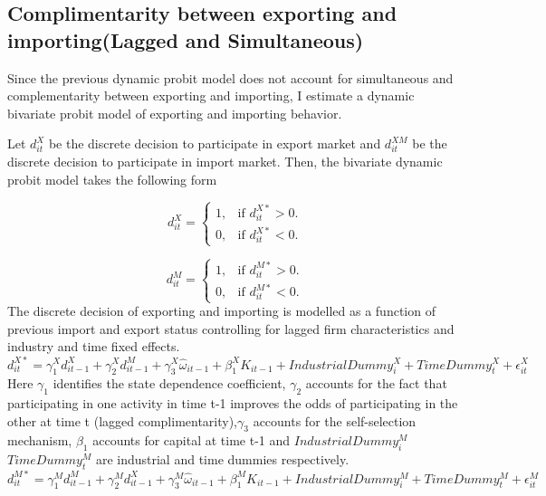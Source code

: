 \documentclass[11pt]{article}
\begin{document}
\subsection{Complimentarity between exporting and importing(Lagged and
Simultaneous)}
Since the previous dynamic probit model does not account for simultaneous and
 complementarity between exporting and importing, I estimate a
dynamic bivariate probit model of exporting and importing behavior. 

Let $d_{it}^{X}$ be the discrete decision to participate in export
market and $d_{it}^{XM}$ be the discrete decision to participate in import
market.  Then, the bivariate dynamic probit model takes the following form 

\begin{equation}
  d_{it}^{X}=\begin{cases}
   1 , & \text{if $d_{it}^{X*}>  0$}.\\
   0 , & \text{if $d_{it}^{X*}<  0$}.
  \end{cases}
\end{equation}

\begin{equation}
  d_{it}^{M}=\begin{cases}
   1 , & \text{if $d_{it}^{M*}>  0$}.\\
   0 , & \text{if $d_{it}^{M*}<  0$}.
  \end{cases}
\end{equation}
The discrete decision of exporting and importing is modelled as a function of previous import and
export status controlling for lagged firm characteristics and industry and time fixed
effects. 
\begin{equation}
d_{it}^{X*} = \gamma_{1}^{X} d_{it-1}^{X} + \gamma_{2}^{X} d_{it-1}^{M}+
\gamma_{3}^{X} \hat{\omega}_{it-1}  + \beta_{1}^{X}K_{it-1}  +
IndustrialDummy_{i}^{X} + TimeDummy_{t}^{X}  + \epsilon_{it}^{X}
\end{equation}
Here $\gamma_{1}$ identifies the state dependence coefficient, $\gamma_{2}$ accounts for
the fact that participating in one activity in time t-1 improves the
odds of participating in the other at time t (lagged complimentarity),$\gamma_{3}$ accounts for
the self-selection mechanism, $\beta_{1}$ accounts for capital at time
t-1 and $IndustrialDummy_{i}^{M}$  $TimeDummy_{t}^{M}$ are industrial
and time dummies respectively.
\begin{equation}
d_{it}^{M*} = \gamma_{1}^{M} d_{it-1}^{M} + \gamma_{2}^{M} d_{it-1}^{X}+
\gamma_{3}^{M} \hat{\omega}_{it-1}  + \beta_{1}^{M}K_{it-1}  +
IndustrialDummy_{i}^{M} + TimeDummy_{t}^{M}  + \epsilon_{it}^{M}
\end{equation}
\end{document}
